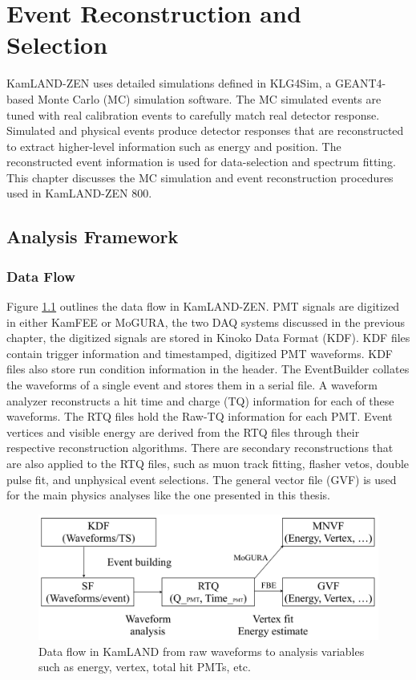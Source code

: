 \chapter{Event Reconstruction and Selection}
\label{chapter:reco_select}
\thispagestyle{myheadings}

\graphicspath{{3_Chapter_KLZ_Reconstruction_and_Selection/Figures/}}

KamLAND-ZEN uses detailed simulations defined in KLG4Sim, a GEANT4-based Monte Carlo (MC) simulation software. The MC simulated events are tuned with real calibration events to carefully match real detector response. Simulated and physical events produce detector responses that are reconstructed to extract higher-level information such as energy and position. The reconstructed event information is used for data-selection and spectrum fitting. This chapter discusses the MC simulation and event reconstruction procedures used in KamLAND-ZEN 800.

\section{Analysis Framework}
\subsection{Data Flow}
Figure \ref{fig:dataflow} outlines the data flow in KamLAND-ZEN. PMT signals are digitized in either KamFEE or MoGURA, the two DAQ systems discussed in the previous chapter, the digitized signals are stored in Kinoko Data Format (KDF). KDF files contain trigger information and timestamped, digitized PMT waveforms. KDF files also store run condition information in the header. The EventBuilder collates the waveforms of a single event and stores them in a serial file. A waveform analyzer reconstructs a hit time and charge (TQ) information for each of these waveforms. The RTQ files hold the Raw-TQ information for each PMT. Event vertices and visible energy are derived from the RTQ files through their respective reconstruction algorithms. There are secondary reconstructions that are also applied to the RTQ files, such as muon track fitting, flasher vetos, double pulse fit, and unphysical event selections. The general vector file (GVF) is used for the main physics analyses like the one presented in this thesis.

\begin{figure}[htb]
	\centering
	\includegraphics[scale=0.3]{dataflow.png}
	\caption{Data flow in KamLAND from raw waveforms to analysis variables such as energy, vertex, total hit PMTs, etc. \cite{ozaki_phd}}
	\label{fig:dataflow}
\end{figure}

